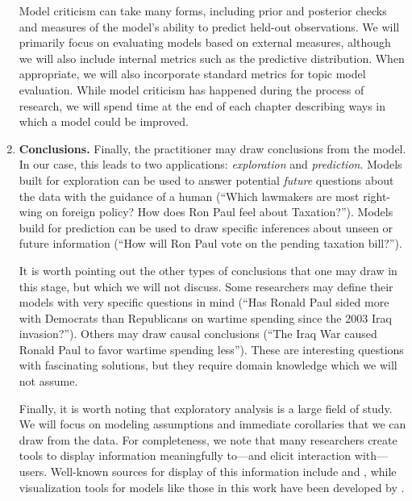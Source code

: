\begin{enumerate}
    Model criticism can take many forms, including prior and posterior
    checks \citep{box:1980,gelman:1996} and measures of the model's
    ability to predict held-out observations. We will primarily focus
    on evaluating models based on external measures, although we will
    also include internal metrics such as the predictive
    distribution. When appropriate, we will also incorporate standard
    metrics for topic model evaluation.  While model criticism has
    happened during the process of research, we will spend time at the
    end of each chapter describing ways in which a model could be
    improved. \nocite{wallach:2009}
  
  \item \textbf{Conclusions.} Finally, the practitioner may draw
    conclusions from the model.  In our case, this leads to two
    applications: \emph{exploration} and \emph{prediction}.  Models
    built for exploration can be used to answer potential \emph{future}
    questions about the data with the guidance of a human (``Which
    lawmakers are most right-wing on foreign policy?  How does Ron
    Paul feel about Taxation?'').  Models
    build for prediction can be used to draw specific inferences about
    unseen or future information (``How will Ron Paul vote on the
    pending taxation bill?'').

    It is worth pointing out the other types of conclusions that one
    may draw in this stage, but which we will not discuss. Some
    researchers may define their models with very specific questions
    in mind (``Has Ronald Paul sided more with Democrats than
    Republicans on wartime spending since the 2003 Iraq invasion?'').
    Others may draw causal conclusions (``The Iraq War caused Ronald
    Paul to favor wartime spending less''). These are interesting
    questions with fascinating solutions, but they require domain
    knowledge which we will not assume.

    Finally, it is worth noting that exploratory analysis is a large
    field of study.  We will focus on modeling assumptions and
    immediate corollaries that we can draw from the data.  For
    completeness, we note that many researchers create tools to
    display information meaningfully to---and elicit interaction
    with---users.  Well-known sources for display of this information
    include \cite{tufte:2001} and \cite{wilkinson:2005}, while
    visualization tools for models like those in this work have been
    developed by \cite{chaney:2012}.

\end{enumerate}

